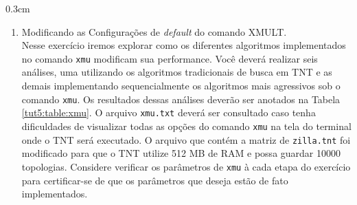 \begin{refsection}
\begin {myindentpar}{0.3cm}
\begin{enumerate}[\itshape i.]
	\item{Modificando as Configurações de \textit{default} do comando XMULT.}\\
Nesse exercício iremos explorar como os diferentes algoritmos implementados no comando \texttt{xmu} modificam sua performance. Você deverá realizar seis análises, uma utilizando os algoritmos tradicionais de busca em TNT e as demais implementando sequencialmente os algoritmos mais agressivos sob o comando \texttt{xmu}. Os resultados dessas análises deverão ser anotados na Tabela \ref{tut5:table:xmu}. O arquivo \texttt{xmu.txt} deverá ser consultado caso tenha dificuldades de visualizar todas as opções do comando \texttt{xmu} na tela do terminal onde o TNT será executado. O arquivo que contém a matriz de \texttt{zilla.tnt} foi modificado para que o TNT utilize 512 MB de RAM e possa guardar 10000 topologias. Considere verificar os parâmetros de \texttt{xmu} à cada etapa do exercício para certificar-se de que os parâmetros que deseja estão de fato implementados.


\end{enumerate}
\end{myindentpar}
\end{refsection}
